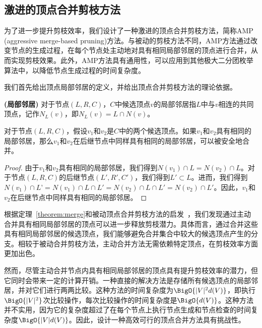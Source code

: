 \subsection{激进的顶点合并剪枝方法}
\label{subsec:amp}


为了进一步提升剪枝效率，我们设计了一种激进的顶点合并剪枝方法，简称AMP (aggressive merge-based pruning)方法。与被动的剪枝方法不同，AMP方法通过改变节点的生成过程，在每个节点处主动地对具有相同局部邻居的顶点进行合并，从而实现剪枝效果。此外，AMP方法具有通用性，可以应用到其他极大二分团枚举算法中，以降低节点生成过程的时间复杂度。

我们首先给出顶点局部邻居的定义，并给出顶点合并剪枝方法的理论依据。

\begin{definition}
  \textbf{(局部邻居)} 对于节点$(L,R,C)$，$C$中候选顶点$v$的局部邻居指$L$中与$v$相连的共同顶点，记作$N_L(v)$，即$N_L(v) = L \cap N(v)$。
\end{definition}

\begin{theorem}
  对于节点$(L,R,C)$，假设$v_1$和$v_2$是$C$中的两个候选顶点。如果$v_1$和$v_2$具有相同的局部邻居，那么$v_1$和$v_2$在后继节点中同样具有相同的局部邻居，可以被安全地合并。
  \label{theorem:merge}
\end{theorem}

\begin{proof}
  由于$v_1$和$v_2$具有相同的局部邻居，我们得到$N(v_1)\cap L = N(v_2)\cap L$。对于节点$(L,R,C)$的后继节点$(L',R',C')$，我们得到$L' \subset L$。进而，我们得到$N(v_1)\cap L’ = N(v_1) \cap L \cap L' = N(v_2) \cap L \cap L' = N(v_2)\cap L'$。因此，$v_1$和$v_2$在后继节点中同样具有相同的局部邻居。
\end{proof}


根据定理~\ref{theorem:merge}和被动顶点合并剪枝方法的启发~\cite{iMBEA14}，我们发现通过主动合并具有相同局部邻居的顶点可以进一步释放剪枝潜力。具体而言，通过合并这些具有相同局部邻居的候选顶点，我们能够避免合并集合中较大的候选顶点产生的分支。相较于被动合并剪枝方法，主动合并方法无需依赖特定顶点，在剪枝效率方面更加出色。

然而，尽管主动合并节点内具有相同局部邻居的顶点具有提升剪枝效率的潜力，但它同时会带来一定的计算开销。一种直接的解决方法是存储所有候选顶点的局部邻居，并对它们进行两两比较。这种方法的时间复杂度为$\BigO{|V|^2d(V)}$，即执行$\BigO{|V|^2}$次比较操作，每次比较操作的时间复杂度是$\BigO{d(V)}$。这种方法并不实用，因为它的复杂度超过了在每个节点上执行节点生成和节点检查的时间复杂度$\BigO{|V|d(V)}$。因此，设计一种高效可行的顶点合并方法具有挑战性。

